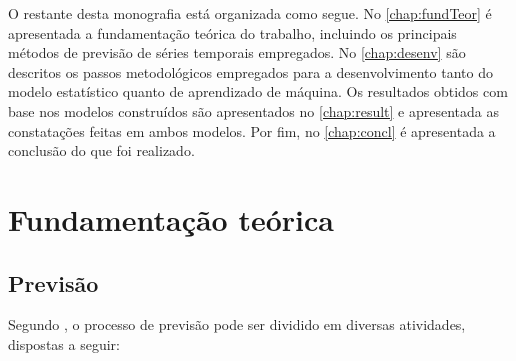 \documentclass[
    12pt,
    oneside,
    a4paper,
    english,
    brazil
]{abntex2}
\begin{document}

O    restante   desta    monografia    está   organizada    como   segue.    No
\autoref{chap:fundTeor}  é apresentada  a  fundamentação  teórica do  trabalho,
incluindo os principais métodos de  previsão de séries temporais empregados. No
\autoref{chap:desenv} são  descritos os passos metodológicos  empregados para a
desenvolvimento tanto do  modelo estatístico quanto de  aprendizado de máquina.
Os  resultados obtidos  com base  nos modelos  construídos são  apresentados no
\autoref{chap:result} e  apresentada as  constatações feitas em  ambos modelos.
Por  fim,  no  \autoref{chap:concl}  é  apresentada  a  conclusão  do  que  foi
realizado.

\chapter{Fundamentação teórica}\label{chap:fundTeor}

\section{Previsão}
Segundo  ,  o  processo  de previsão  pode  ser  dividido  em
diversas atividades, dispostas a seguir:
\end{document}
